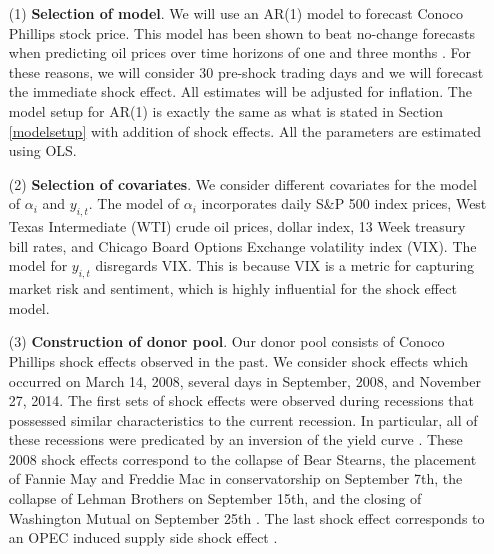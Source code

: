 \documentclass[11pt,3p,review,authoryear]{elsarticle}
\theoremstyle{definition}
\begin{document}
\begin{enumerate}
\item[(1)] {\bf Selection of model}. We will use an AR(1) model to forecast Conoco Phillips stock price. This model has been shown to beat no-change forecasts when predicting oil prices over time horizons of one and three months \citep{alquist2013forecasting}.  For these reasons, we will consider 30 pre-shock trading days and we will forecast the immediate shock effect. All estimates will be adjusted for inflation. The model setup for AR(1) is exactly the same as what is stated in Section \ref{modelsetup} with addition of shock effects. All the parameters are estimated using OLS.
\item[(2)] {\bf Selection of covariates}. We consider different covariates for the model of $\alpha_i$ and $y_{i, t}$. The model of $\alpha_i$ incorporates daily S\&P 500 index prices, West Texas Intermediate (WTI) crude oil prices, dollar index, 13 Week treasury bill rates, and Chicago Board Options Exchange volatility index (VIX). The model for $y_{i,t}$ disregards VIX. This is because VIX is a metric for capturing market risk and sentiment, which is highly influential for the shock effect model.
\item[(3)] {\bf Construction of donor pool}. Our donor pool consists of Conoco Phillips shock effects observed in the past. We consider shock effects which occurred on March 14, 2008, several days in September, 2008, and November 27, 2014. The first sets of shock effects were observed during recessions that possessed similar characteristics to the current recession. In particular, all of these recessions were predicated by an inversion of the yield curve \citep{bauer2018economic}. These 2008 shock effects correspond to the collapse of Bear Stearns, the placement of Fannie May and Freddie Mac in conservatorship on September 7th, the collapse of Lehman Brothers on September 15th, and the closing of Washington Mutual on September 25th \citep{shorter2008bear, ewing2013volatility, dwyer2009financial, longstaff2010subprime}. The last shock effect corresponds to an OPEC induced supply side shock effect \citep{huppmann2015opec}. 
\end{enumerate}
\end{document}
